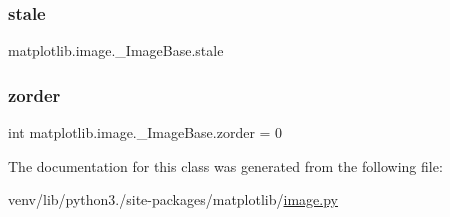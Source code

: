 \subsubsection{\texorpdfstring{stale}{stale}}
{\footnotesize\ttfamily matplotlib.\+image.\+\_\+\+Image\+Base.\+stale}

\mbox{\label{classmatplotlib_1_1image_1_1__ImageBase_a8f3acf11a85ca1a4bb68009e2905a3a9}} 
\subsubsection{\texorpdfstring{zorder}{zorder}}
{\footnotesize\ttfamily int matplotlib.\+image.\+\_\+\+Image\+Base.\+zorder = 0\hspace{0.3cm}{\ttfamily [static]}}



The documentation for this class was generated from the following file\+:\begin{DoxyCompactItemize}
\item 
venv/lib/python3./site-\/packages/matplotlib/\hyperlink{image_8py}{image.\+py}\end{DoxyCompactItemize}
